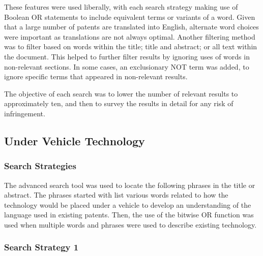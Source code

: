 \documentclass [12pt]{article}
\begin{document}
These features were used liberally, with each search strategy making use of Boolean OR statements to include equivalent terms or variants of a word. Given that a large number of patents are translated into English, alternate word choices were important as translations are not always optimal. Another filtering method was to filter based on words within the title; title and abstract; or all text within the document. This helped to further filter results by ignoring uses of words in non-relevant sections. In some cases, an exclusionary NOT term was added, to ignore specific terms that appeared in non-relevant results.

The objective of each search was to lower the number of relevant results to approximately ten, and then to survey the results in detail for any risk of infringement.

\subsection{Under Vehicle Technology}\label{sec:under_vehilce_technology}

\subsubsection{Search Strategies}

The advanced search tool was used to locate the following phrases in the title or abstract. The phrases started with list various words related to how the technology would be placed under a vehicle to develop an understanding of the language used in existing patents. Then, the use of the bitwise OR function was used when multiple words and phrases were used to describe existing technology.

\subsubsection{Search Strategy 1}
\end{document}
